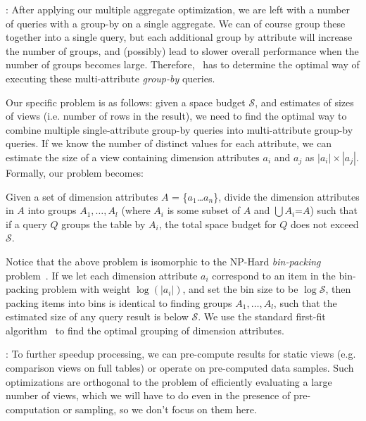 :
After applying our multiple aggregate optimization, we are left with a number of 
queries with a group-by on a single aggregate.
We can of course group these together into a single query, but each additional 
group by attribute will increase the number of groups, and (possibly) lead to slower
overall performance when the number of groups becomes large.  
Therefore, \SeeDB\ has to determine the optimal way of executing these multi-attribute
{\it group-by} queries.

Our specific problem is as follows: given a space budget $\mathcal{S}$,
and estimates of sizes of views (i.e. number of rows in the result), we need to find the optimal
way to combine multiple single-attribute group-by queries into multi-attribute group-by queries.
If we know the number of distinct values for each attribute, we can estimate the
size of a view containing dimension attributes $a_i$ and $a_j$ as $|a_i|\times |a_j|$.
Formally, our problem becomes:
\vspace{-5pt}
\begin{problem}
Given a set of dimension attributes $A$ = \{$a_1$\ldots$a_n$\}, divide the
dimension attributes in $A$ into groups $A_1, \ldots, A_l$ (where $A_i$ is some
subset of $A$ and $\bigcup A_i$=$A$) such that if a query $Q$ groups the table by $A_i$, 
the total space budget for $Q$ does not exceed $\mathcal{S}$.
\vspace{-5pt}
\end{problem}

Notice that the above problem is isomorphic to the NP-Hard {\em bin-packing} problem~\cite{garey}.
If we let each dimension attribute
$a_i$ correspond to an item in the bin-packing problem with weight $\log (|a_i|)$,
and set the bin size to be $\log \mathcal{S}$,
then packing items into bins is identical to finding groups $A_1, \ldots, A_l$,
such that the estimated size of any query result is below $\mathcal{S}$.
We use the standard first-fit algorithm~\cite{first-fit} to find the optimal
grouping of dimension attributes.

: 
To further speedup processing, we can pre-compute results for 
static views (e.g. comparison views on full tables) or operate on
pre-computed data samples.  Such optimizations are orthogonal to the
problem of efficiently evaluating a large number of views, which we will have to
do even in the presence of pre-computation or sampling, so we don't focus on them here.


